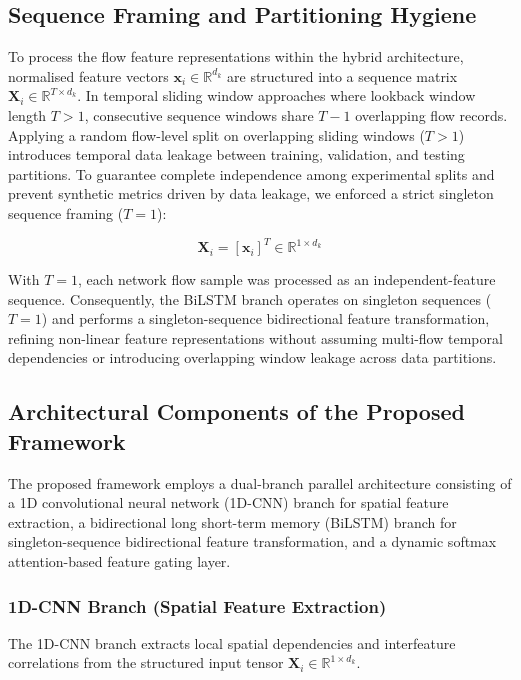 \documentclass[a4paper,fleqn]{cas-sc}
\begin{document}
\subsection{Sequence Framing and Partitioning Hygiene}

To process the flow feature representations within the hybrid architecture, normalised feature vectors $\mathbf{x}_i \in \mathbb{R}^{d_k}$ are structured into a sequence matrix $\mathbf{X}_i \in \mathbb{R}^{T \times d_k}$. In temporal sliding window approaches where lookback window length $T > 1$, consecutive sequence windows share $T-1$ overlapping flow records. Applying a random flow-level split on overlapping sliding windows ($T > 1$) introduces temporal data leakage between training, validation, and testing partitions.
To guarantee complete independence among experimental splits and prevent synthetic metrics driven by data leakage, we enforced a strict singleton sequence framing ($T = 1$):

\begin{equation}
\mathbf{X}_i = [\mathbf{x}_i]^T \in \mathbb{R}^{1 \times d_k}
\end{equation}

With $T = 1$, each network flow sample was processed as an independent-feature sequence. Consequently, the BiLSTM branch operates on singleton sequences ($T = 1$) and performs a singleton-sequence bidirectional feature transformation, refining non-linear feature representations without assuming multi-flow temporal dependencies or introducing overlapping window leakage across data partitions.

\subsection{Architectural Components of the Proposed Framework}

The proposed framework employs a dual-branch parallel architecture consisting of a 1D convolutional neural network (1D-CNN) branch for spatial feature extraction, a bidirectional long short-term memory (BiLSTM) branch for singleton-sequence bidirectional feature transformation, and a dynamic softmax attention-based feature gating layer.

\subsubsection{1D-CNN Branch (Spatial Feature Extraction)}

The 1D-CNN branch extracts local spatial dependencies and interfeature correlations from the structured input tensor $\mathbf{X}_i \in \mathbb{R}^{1 \times d_k}$.
\end{document}
